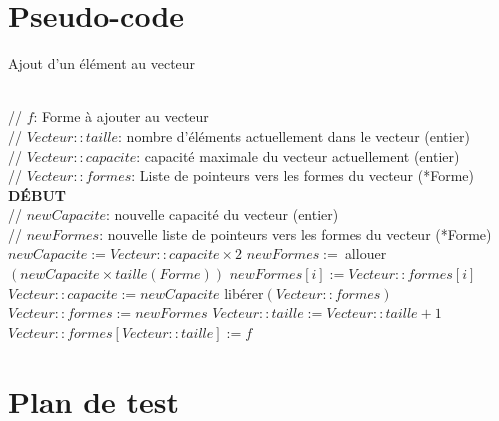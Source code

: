 \documentclass[a11paper, 11pt]{article}
\begin{document}
\section{Pseudo-code}

\begin{algorithm} %
\caption{Ajout d'un élément au vecteur}\label{alg:ajouterForme}
\begin{algorithmic}[1]
  \\
  \hspace{.5cm}// $f$: Forme à ajouter au vecteur\\
  \hspace{.5cm}// $Vecteur::taille$: nombre d'éléments actuellement dans le vecteur (entier)\\
  \hspace{.5cm}// $Vecteur::capacite$: capacité maximale du vecteur actuellement (entier)\\
  \hspace{.5cm}// $Vecteur::formes$: Liste de pointeurs vers les formes du vecteur (*Forme)\\
  \textbf{DÉBUT}\\
  \hspace{.5cm}// $newCapacite$: nouvelle capacité du vecteur (entier)\\
  \hspace{.5cm}// $newFormes$: nouvelle liste de pointeurs vers les formes du vecteur (*Forme)
    \State{}
  \EndIf
    \State $newCapacite := Vecteur::capacite\times2$
      \State{}
    \EndIf
    \State $newFormes :=\ $allouer$(newCapacite\times taille(Forme))$
      \State $newFormes[i] := Vecteur::formes[i]$
    \EndFor
    \State $Vecteur::capacite := newCapacite$
    \State libérer$(Vecteur::formes)$
    \State $Vecteur::formes := newFormes$
  \EndIf
  \State $Vecteur::taille := Vecteur::taille + 1$
  \State $Vecteur::formes[Vecteur::taille] := f$
  \State {}
  \EndFunction
\end{algorithmic}
\end{algorithm} %

\section{Plan de test}
\end{document}
